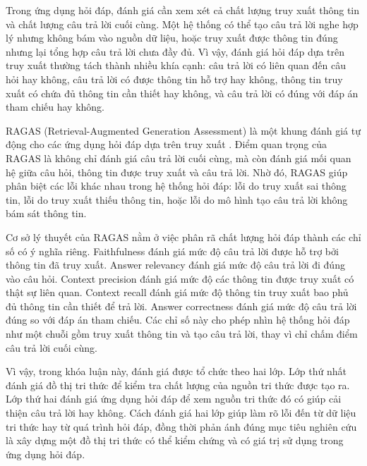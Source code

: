 Trong ứng dụng hỏi đáp, đánh giá cần xem xét cả chất lượng truy xuất thông tin và chất lượng câu trả lời cuối cùng. Một hệ thống có thể tạo câu trả lời nghe hợp lý nhưng không bám vào nguồn dữ liệu, hoặc truy xuất được thông tin đúng nhưng lại tổng hợp câu trả lời chưa đầy đủ. Vì vậy, đánh giá hỏi đáp dựa trên truy xuất thường tách thành nhiều khía cạnh: câu trả lời có liên quan đến câu hỏi hay không, câu trả lời có được thông tin hỗ trợ hay không, thông tin truy xuất có chứa đủ thông tin cần thiết hay không, và câu trả lời có đúng với đáp án tham chiếu hay không.

RAGAS (Retrieval-Augmented Generation Assessment) là một khung đánh giá tự động cho các ứng dụng hỏi đáp dựa trên truy xuất \cite{es2023ragas}. Điểm quan trọng của RAGAS là không chỉ đánh giá câu trả lời cuối cùng, mà còn đánh giá mối quan hệ giữa câu hỏi, thông tin được truy xuất và câu trả lời. Nhờ đó, RAGAS giúp phân biệt các lỗi khác nhau trong hệ thống hỏi đáp: lỗi do truy xuất sai thông tin, lỗi do truy xuất thiếu thông tin, hoặc lỗi do mô hình tạo câu trả lời không bám sát thông tin.

Cơ sở lý thuyết của RAGAS nằm ở việc phân rã chất lượng hỏi đáp thành các chỉ số có ý nghĩa riêng. Faithfulness đánh giá mức độ câu trả lời được hỗ trợ bởi thông tin đã truy xuất. Answer relevancy đánh giá mức độ câu trả lời đi đúng vào câu hỏi. Context precision đánh giá mức độ các thông tin được truy xuất có thật sự liên quan. Context recall đánh giá mức độ thông tin truy xuất bao phủ đủ thông tin cần thiết để trả lời. Answer correctness đánh giá mức độ câu trả lời đúng so với đáp án tham chiếu. Các chỉ số này cho phép nhìn hệ thống hỏi đáp như một chuỗi gồm truy xuất thông tin và tạo câu trả lời, thay vì chỉ chấm điểm câu trả lời cuối cùng.

Vì vậy, trong khóa luận này, đánh giá được tổ chức theo hai lớp. Lớp thứ nhất đánh giá đồ thị tri thức để kiểm tra chất lượng của nguồn tri thức được tạo ra. Lớp thứ hai đánh giá ứng dụng hỏi đáp để xem nguồn tri thức đó có giúp cải thiện câu trả lời hay không. Cách đánh giá hai lớp giúp làm rõ lỗi đến từ dữ liệu tri thức hay từ quá trình hỏi đáp, đồng thời phản ánh đúng mục tiêu nghiên cứu là xây dựng một đồ thị tri thức có thể kiểm chứng và có giá trị sử dụng trong ứng dụng hỏi đáp.
